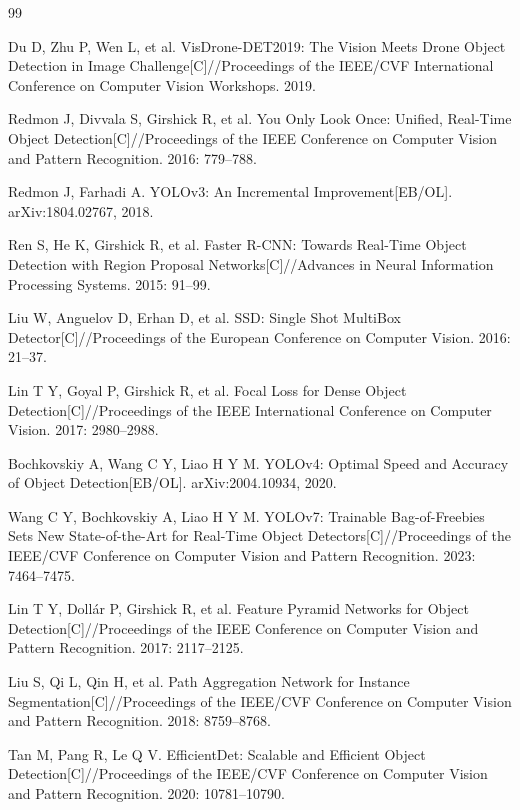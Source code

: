 \documentclass[UTF8,a4paper,10.5pt,fontset=windows]{ctexart}
\begin{document}
\begin{thebibliography}{99}

Du D, Zhu P, Wen L, et al. VisDrone-DET2019: The Vision Meets Drone Object Detection in Image Challenge[C]//Proceedings of the IEEE/CVF International Conference on Computer Vision Workshops. 2019.

Redmon J, Divvala S, Girshick R, et al. You Only Look Once: Unified, Real-Time Object Detection[C]//Proceedings of the IEEE Conference on Computer Vision and Pattern Recognition. 2016: 779--788.

Redmon J, Farhadi A. YOLOv3: An Incremental Improvement[EB/OL]. arXiv:1804.02767, 2018.

Ren S, He K, Girshick R, et al. Faster R-CNN: Towards Real-Time Object Detection with Region Proposal Networks[C]//Advances in Neural Information Processing Systems. 2015: 91--99.

Liu W, Anguelov D, Erhan D, et al. SSD: Single Shot MultiBox Detector[C]//Proceedings of the European Conference on Computer Vision. 2016: 21--37.

Lin T Y, Goyal P, Girshick R, et al. Focal Loss for Dense Object Detection[C]//Proceedings of the IEEE International Conference on Computer Vision. 2017: 2980--2988.

Bochkovskiy A, Wang C Y, Liao H Y M. YOLOv4: Optimal Speed and Accuracy of Object Detection[EB/OL]. arXiv:2004.10934, 2020.

Wang C Y, Bochkovskiy A, Liao H Y M. YOLOv7: Trainable Bag-of-Freebies Sets New State-of-the-Art for Real-Time Object Detectors[C]//Proceedings of the IEEE/CVF Conference on Computer Vision and Pattern Recognition. 2023: 7464--7475.

Lin T Y, Dollár P, Girshick R, et al. Feature Pyramid Networks for Object Detection[C]//Proceedings of the IEEE Conference on Computer Vision and Pattern Recognition. 2017: 2117--2125.

Liu S, Qi L, Qin H, et al. Path Aggregation Network for Instance Segmentation[C]//Proceedings of the IEEE/CVF Conference on Computer Vision and Pattern Recognition. 2018: 8759--8768.

Tan M, Pang R, Le Q V. EfficientDet: Scalable and Efficient Object Detection[C]//Proceedings of the IEEE/CVF Conference on Computer Vision and Pattern Recognition. 2020: 10781--10790.


\end{thebibliography}
\end{document}
